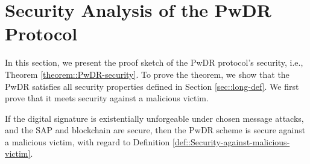 
\section{Security Analysis of the PwDR Protocol}\label{sec::proof}

In this section, we present the proof sketch of the PwDR protocol's security, i.e., Theorem \ref{theorem::PwDR-security}. 
To prove the theorem, we show that the PwDR satisfies all security properties defined in Section \ref{sec::long-def}. We first prove that it meets security against a malicious victim. 


%
%








\begin{lemma}\label{lemma::secure-against-a-malicious-victim} If the digital signature is existentially unforgeable under chosen message attacks, and the SAP and blockchain are secure, then the PwDR scheme is secure against a malicious victim, with regard to Definition \ref{def::Security-against-malicious-victim}. 
\end{lemma}

